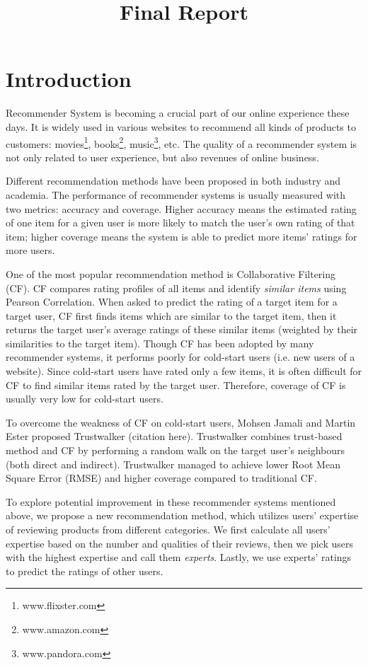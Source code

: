\documentclass[12pt]{article}
\title{Final Report}
\author{}
\begin{document}
\maketitle

\section{Introduction}
Recommender System is becoming a crucial part of our online experience these days. It is widely used in various websites to recommend all kinds of products to customers: movies\footnote[1]{www.flixster.com}, books\footnote[2]{www.amazon.com}, music\footnote[3]{www.pandora.com}, etc. The quality of a recommender system is not only related to user experience, but also revenues of online business.  

Different recommendation methods have been proposed in both industry and academia. The performance of recommender systems is usually measured with two metrics: accuracy and coverage. Higher accuracy means the estimated rating of one item for a given user is more likely to match the user's own rating of that item; higher coverage means the system is able to predict more items' ratings for more users. 

One of the most popular recommendation method is Collaborative Filtering (CF). CF compares rating profiles of all items and identify \emph{similar items} using Pearson Correlation. When asked to predict the rating of a target item for a target user, CF first finds items which are similar to the target item, then it returns the target user's average ratings of these similar items (weighted by their similarities to the target item). Though CF has been adopted by many recommender systems, it performs poorly for cold-start users (i.e. new users of a website). Since cold-start users have rated only a few items, it is often difficult for CF to find similar items rated by the target user. Therefore, coverage of CF is usually very low for cold-start users. 

To overcome the weakness of CF on cold-start users, Mohsen Jamali and Martin Ester proposed Trustwalker (citation here). Trustwalker combines trust-based method and CF by performing a random walk on the target user's neighbours (both direct and indirect). Trustwalker managed to achieve lower Root Mean Square Error (RMSE) and higher coverage compared to traditional CF. 

To explore potential improvement in these recommender systems mentioned above, we propose a new recommendation method, which utilizes users' expertise of reviewing products from different categories. We first calculate all users' expertise based on the number and qualities of their reviews, then we pick users with the highest expertise and call them \emph{experts}. Lastly, we use experts' ratings to predict the ratings of other users. 
\end{document}
